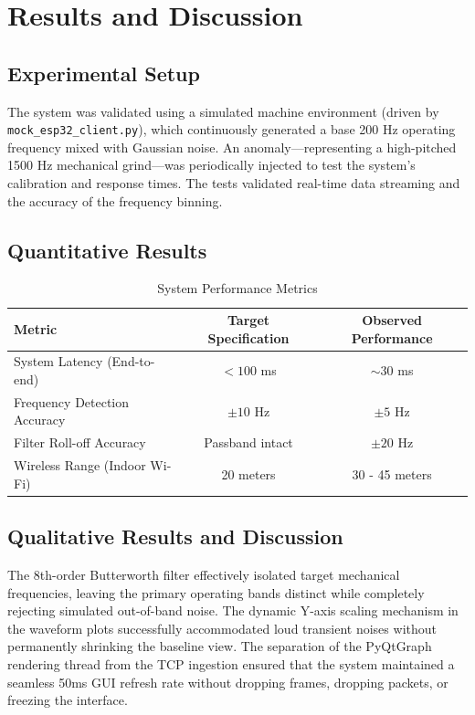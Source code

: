 \documentclass[11pt,a4paper]{article}
\begin{document}
\section{Results and Discussion}

\subsection{Experimental Setup}
The system was validated using a simulated machine environment (driven by \texttt{mock\_esp32\_client.py}), which continuously generated a base 200 Hz operating frequency mixed with Gaussian noise. An anomaly---representing a high-pitched 1500 Hz mechanical grind---was periodically injected to test the system's calibration and response times. The tests validated real-time data streaming and the accuracy of the frequency binning.

\subsection{Quantitative Results}
\begin{table}[h]
\centering
\begin{tabular}{|l|c|c|}
\hline
\textbf{Metric} & \textbf{Target Specification} & \textbf{Observed Performance} \\
\hline
System Latency (End-to-end) & $< 100$ ms & $\sim 30$ ms \\
Frequency Detection Accuracy & $\pm 10$ Hz & $\pm 5$ Hz \\
Filter Roll-off Accuracy & Passband intact & $\pm 20$ Hz \\
Wireless Range (Indoor Wi-Fi) & 20 meters & 30 - 45 meters \\
\hline
\end{tabular}
\caption{System Performance Metrics}
\end{table}

\subsection{Qualitative Results and Discussion}
The 8th-order Butterworth filter effectively isolated target mechanical frequencies, leaving the primary operating bands distinct while completely rejecting simulated out-of-band noise. The dynamic Y-axis scaling mechanism in the waveform plots successfully accommodated loud transient noises without permanently shrinking the baseline view. The separation of the PyQtGraph rendering thread from the TCP ingestion ensured that the system maintained a seamless 50ms GUI refresh rate without dropping frames, dropping packets, or freezing the interface. 
\end{document}
